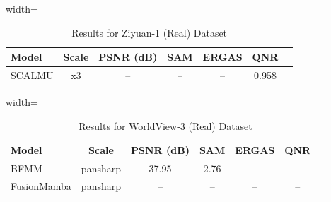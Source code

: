 \documentclass[conference]{IEEEtran}
\begin{document}
\begin{table}[htbp]
\caption{Results for Ziyuan-1 (Real) Dataset \cite{ziyuan_dataset}}
\begin{center}
\begin{adjustbox}{width=\columnwidth}
\begin{tabular}{lcccccc}
\toprule
\textbf{Model} & \textbf{Scale} & \textbf{PSNR (dB)} & \textbf{SAM} & \textbf{ERGAS} & \textbf{QNR} \\
\midrule
SCALMU \cite{xu2026scalmu} & x3 & -- & -- & -- & 0.958 \\
\bottomrule
\end{tabular}
\end{adjustbox}
\label{tab:ziyuan}
\end{center}
\end{table}

\begin{table}[htbp]
\caption{Results for WorldView-3 (Real) Dataset \cite{wv3_dataset}}
\begin{center}
\begin{adjustbox}{width=\columnwidth}
\begin{tabular}{lcccccc}
\toprule
\textbf{Model} & \textbf{Scale} & \textbf{PSNR (dB)} & \textbf{SAM} & \textbf{ERGAS} & \textbf{QNR} \\
\midrule
BFMM \cite{li2026bfmm} & pansharp & 37.95 & 2.76 & -- & -- \\
FusionMamba \cite{peng2024fusionmamba} & pansharp & -- & -- & -- & -- \\
\bottomrule
\end{tabular}
\end{adjustbox}
\label{tab:wv3}
\end{center}
\end{table}



\end{document}
